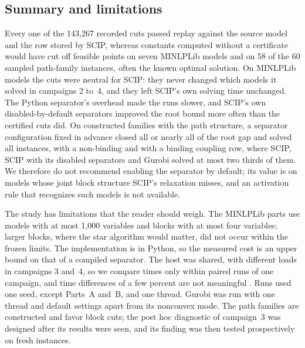 \subsection{Summary and limitations}\label{sec:comp-summary}

Every one of the 143{,}267 recorded cuts passed replay against the source
model and the row stored by SCIP, whereas constants computed without a
certificate would have cut off feasible points on seven MINLPLib models and on
58 of the 60 sampled path-family instances, often the known optimal solution. On MINLPLib models the
cuts were neutral for SCIP: they never changed which models it solved in
campaigns 2 to~4, and they left SCIP's own solving time unchanged. The
Python separator's overhead made the runs slower, and SCIP's own
disabled-by-default separators improved the root bound more often than the
certified cuts did. On constructed families with the path structure, a
separator configuration fixed in advance closed all or nearly all of the root
gap and solved all instances, with a non-binding and with a binding coupling row, where SCIP,
SCIP with its disabled separators and Gurobi solved at most two thirds of them.
We therefore do not recommend enabling the separator by default; its value is
on models whose joint block structure SCIP's relaxation misses, and an
activation rule that recognizes such models is not available.

The study has limitations that the reader should weigh. The MINLPLib parts use
models with at most 1{,}000 variables and blocks with at most four variables;
larger blocks, where the star algorithm would matter, did not occur within the
frozen limits. The implementation is in Python, so the measured cost is an
upper bound on that of a compiled separator. The host was shared, with
different loads in campaigns 3 and~4, so we compare times only within paired
runs of one campaign, and time differences of a few percent are not
meaningful \citep{LodiTramontani2013}. Runs used one seed, except Parts~A and~B,
and one thread. Gurobi was run with one thread and default settings apart from
its nonconvex mode. The path families are constructed and favor block cuts; the
post hoc diagnostic of campaign~3 was designed after its results were seen, and
its finding was then tested prospectively on fresh instances.
